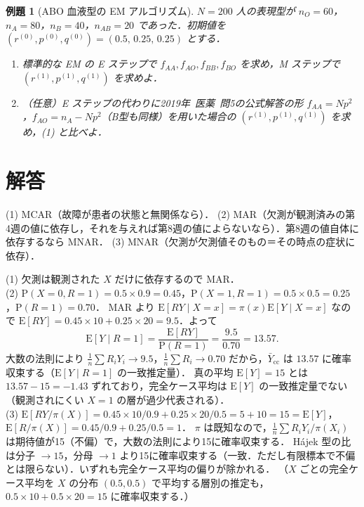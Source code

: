 \documentclass[a4paper,11pt,openany]{ltjsbook}
\newtheorem{reidai}{例題}[chapter]
\newenvironment{kaitou}[1]{%
  \par\medskip\noindent
  \begin{tcolorbox}[enhanced,breakable,colback=bkgray!3,colframe=bkgray!60,boxrule=0.4pt,
    left=4pt,right=4pt,top=2pt,bottom=2pt,arc=1pt,
    title={\cref{#1}の解答},fonttitle=\bfseries\small,coltitle=white,colbacktitle=bkgray!80]}%
  {\end{tcolorbox}\par}
\newcommand{\kakomon}[2]{\mbox{#1年 医薬 問#2}}
\newcommand{\E}{\mathrm{E}}
\newcommand{\Prob}{\mathrm{P}}
\begin{document}
\begin{reidai}[ABO 血液型の EM アルゴリズム]\label{reidai:16-3}
$N=200$ 人の表現型が $n_O=60$，$n_A=80$，$n_B=40$，$n_{AB}=20$ であった．初期値を $(r^{(0)},p^{(0)},q^{(0)})=(0.5,\,0.25,\,0.25)$ とする．
\begin{enumerate}[label=(\arabic*)]
\item 標準的な EM の E ステップで $f_{AA},f_{AO},f_{BB},f_{BO}$ を求め，M ステップで $(r^{(1)},p^{(1)},q^{(1)})$ を求めよ．
\item （任意）E ステップの代わりに\kakomon{2019}{5}の公式解答の形 $f_{AA}=Np^2$，$f_{AO}=n_A-Np^2$（B型も同様）を用いた場合の $(r^{(1)},p^{(1)},q^{(1)})$ を求め，(1) と比べよ．
\end{enumerate}
\end{reidai}

\section{解答}\label{sec:16-sol}
\begin{kaitou}{reidai:16-1}
(1) MCAR（故障が患者の状態と無関係なら）．
(2) MAR（欠測が観測済みの第4週の値に依存し，それを与えれば第8週の値によらないなら）．第8週の値自体に依存するなら MNAR．
(3) MNAR（欠測が欠測値そのもの＝その時点の症状に依存）．
\end{kaitou}

\begin{kaitou}{reidai:16-2}
(1) 欠測は観測された $X$ だけに依存するので MAR．\\
(2) $\Prob(X=0,R=1)=0.5\times0.9=0.45$，$\Prob(X=1,R=1)=0.5\times0.5=0.25$，$\Prob(R=1)=0.70$．
MAR より $\E[RY\mid X=x]=\pi(x)\E[Y\mid X=x]$ なので $\E[RY]=0.45\times10+0.25\times20=9.5$．よって
\[
\E[Y\mid R=1]=\frac{\E[RY]}{\Prob(R=1)}=\frac{9.5}{0.70}=13.57 .
\]
大数の法則により $\frac1n\sum R_iY_i\to9.5$，$\frac1n\sum R_i\to0.70$ だから，$\bar Y_{\mathrm{cc}}$ は $13.57$ に確率収束する（$\E[Y\mid R=1]$ の一致推定量）．
真の平均 $\E[Y]=15$ とは $13.57-15=-1.43$ ずれており，完全ケース平均は $\E[Y]$ の一致推定量でない（観測されにくい $X=1$ の層が過少代表される）．\\
(3) $\E[RY/\pi(X)]=0.45\times10/0.9+0.25\times20/0.5=5+10=15=\E[Y]$，$\E[R/\pi(X)]=0.45/0.9+0.25/0.5=1$．
$\pi$ は既知なので，$\frac1n\sum R_iY_i/\pi(X_i)$ は期待値が15（不偏）で，大数の法則により15に確率収束する．
Hájek 型の比は分子 $\to15$，分母 $\to1$ より15に確率収束する（一致．ただし有限標本で不偏とは限らない）．いずれも完全ケース平均の偏りが除かれる．
（$X$ ごとの完全ケース平均を $X$ の分布 $(0.5,0.5)$ で平均する層別の推定も，$0.5\times10+0.5\times20=15$ に確率収束する．）
\end{kaitou}
\end{document}
